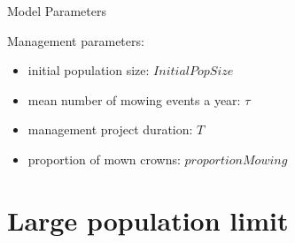 \documentclass{myBeamer}
\newcommand{\N}{\mathbb N}%
\newcommand{\R}{\mathbb R}%
\begin{document}
\begin{frame}{Model Parameters}
\bigbreak

Management parameters:
\begin{itemize}
\item initial population size: $ InitialPopSize $
\item mean number of mowing events a year: $\tau$
\item management project duration: $T$ 
\item proportion of mown crowns: $proportionMowing$
\end{itemize}

\end{frame}






%




\section*{Large population limit}
\end{document}
